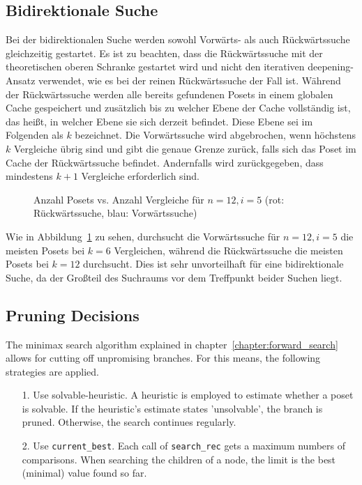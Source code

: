 \documentclass[10pt,journal,compsoc]{IEEEtran}
\begin{document}
\subsection{Bidirektionale Suche} \label{sec:bidirectional}

Bei der bidirektionalen Suche werden sowohl Vorwärts- als auch Rückwärtssuche gleichzeitig gestartet.
Es ist zu beachten, dass die Rückwärtssuche mit der theoretischen oberen Schranke gestartet wird und nicht den iterativen deepening-Ansatz verwendet, wie es bei der reinen Rückwärtssuche der Fall ist.
Während der Rückwärtssuche werden alle bereits gefundenen Posets in einem globalen Cache gespeichert und zusätzlich bis zu welcher Ebene der Cache vollständig ist, das heißt, in welcher Ebene sie sich derzeit befindet.
Diese Ebene sei im Folgenden als $k$ bezeichnet.
Die Vorwärtssuche wird abgebrochen, wenn höchstens $k$ Vergleiche übrig sind und gibt die genaue Grenze zurück, falls sich das Poset im Cache der Rückwärtssuche befindet.
Andernfalls wird zurückgegeben, dass mindestens $k + 1$ Vergleiche erforderlich sind.

\begin{figure}[h!]
  
  \centering
  \caption{Anzahl Posets vs. Anzahl Vergleiche für $n=12, i=5$ (rot: Rückwärtssuche, blau: Vorwärtssuche)}
  \label{fig:backward_forward_count}
\end{figure}

Wie in Abbildung~\ref{fig:backward_forward_count} zu sehen, durchsucht die Vorwärtssuche für $n = 12, i = 5$ die meisten Posets bei $k = 6$ Vergleichen, während die Rückwärtssuche die meisten Posets bei $k = 12$ durchsucht.
Dies ist sehr unvorteilhaft für eine bidirektionale Suche, da der Großteil des Suchraums vor dem Treffpunkt beider Suchen liegt.



\subsection{Pruning Decisions}
The minimax search algorithm explained in chapter~\ref{chapter:forward_search} allows for cutting off unpromising branches. For this means, the following strategies are applied.

\begin{enumerate}
  \item[1.]
    Use solvable-heuristic. A heuristic is employed to estimate whether a poset is solvable. If the heuristic's estimate states 'unsolvable', the branch is pruned.
    Otherwise, the search continues regularly.
  \item[2.]
    Use \texttt{current\_best}. Each call of \texttt{search\_rec} gets a maximum numbers of comparisons.
    When searching the children of a node, the limit is the best (minimal) value found so far.
\end{enumerate}
\end{document}
